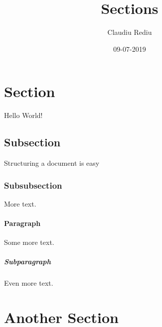 \documentclass{article}
\title{Sections}
\date{09-07-2019}
\author{Claudiu Rediu}
\begin{document}
	\maketitle
	\newpage
	
	\section{Section}
	Hello World!
	
	\subsection{Subsection}
	
	Structuring a document is easy
	
	\subsubsection{Subsubsection}
	
	More text.
	
	\paragraph{Paragraph}
	
	Some more text.
	
	\subparagraph{Subparagraph}
	
	Even more text.
	
	\section{Another Section}
	
\end{document}
